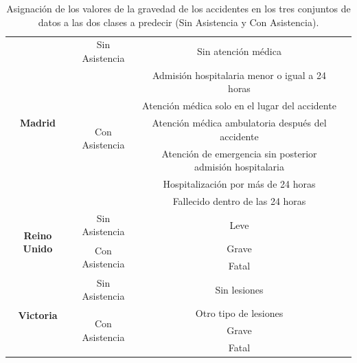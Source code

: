 \documentclass{uathesis-es}
\begin{document}
{\begin{table}[H]
\begin{center}
\begin{tabular}{|c|c||c|c|}
        \multirow{7}{*}{\textbf{Madrid}} & 
            \multirow{1}{*}{Sin Asistencia} & Sin atención médica \\ \cline{2-3} &
            \multirow{6}{*}{Con Asistencia} & Admisión hospitalaria menor o igual a 24 horas  \\ &
                                            & Atención médica solo en el lugar del accidente  \\ &
                                            & Atención médica ambulatoria después del accidente \\ &
                                            & Atención de emergencia sin posterior admisión hospitalaria \\ &
                                            & Hospitalización por más de 24 horas \\ &
                                            & Fallecido dentro de las 24 horas \\ \hline
            \hline
            
        \multirow{3}{*}{\textbf{Reino Unido}} &
            Sin Asistencia & Leve \\ \cline{2-3} &
            \multirow{2}{*}{Con Asistencia} & Grave \\ &
                                            & Fatal  \\ \hline
            \hline
    
        \multirow{4}{*}{\textbf{Victoria}} &
            Sin Asistencia & Sin lesiones \\ \cline{2-3} &
            \multirow{3}{*}{Con Asistencia} & Otro tipo de lesiones \\ &
                                            & Grave  \\ &
                                            & Fatal \\ \hline
            \hline
            
        \end{tabular}
    \end{center}
    \caption{Asignación de los valores de la gravedad de los accidentes en los tres conjuntos de datos a las dos clases a predecir (Sin Asistencia y Con Asistencia).}
    \label{MAPPING_ASSISTANCE}
\end{table}


}
\end{document}
